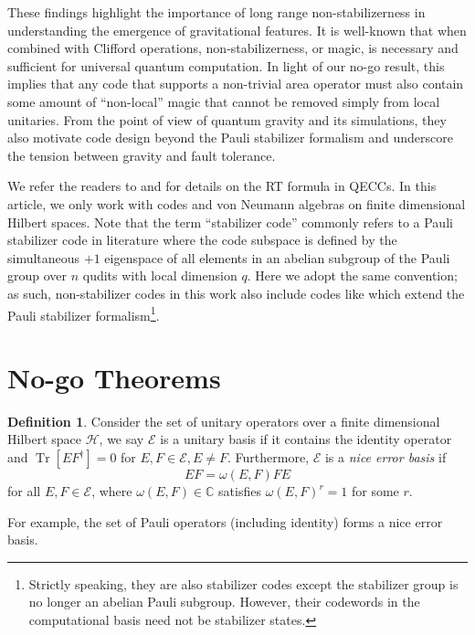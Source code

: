 \documentclass[a4paper,11pt]{article}
\theoremstyle{definition}
\newtheorem{definition}{Definition}[section]
\numberwithin{equation}{section}
\DeclareMathOperator{\Tr}{Tr}
\begin{document}
These findings highlight the importance of long range non-stabilizerness\cite{NLmagic,White:2020zoz,Bao:2022mkc,Liu:2020yso} in understanding the emergence of gravitational features. It is well-known that when combined with Clifford operations, non-stabilizerness, or magic, is necessary and sufficient for universal quantum computation. In light of our no-go result,  this implies that any code that supports a non-trivial area operator must also contain some amount of ``non-local'' magic that cannot be removed simply from local unitaries. 
From the point of view of quantum gravity and its simulations, they also motivate code design beyond the Pauli stabilizer formalism and underscore the tension between gravity and fault tolerance.

We refer the readers to \cite{Harlow:2016vwg} and \cite{Pollack:2021yij} for details on the RT formula in QECCs. In this article, we only work with codes and von Neumann algebras on finite dimensional Hilbert spaces.  Note that the term ``stabilizer code'' commonly refers to a Pauli stabilizer code in literature where the code subspace is defined by the simultaneous $+1$ eigenspace of all elements in an abelian subgroup of the Pauli group over $n$ qudits with local dimension $q$. Here we adopt the same convention; as such, non-stabilizer codes in this work also include codes like \cite{XS,XP} which extend the Pauli stabilizer formalism\footnote{Strictly speaking, they are also stabilizer codes except the stabilizer group is no longer an abelian Pauli subgroup. However, their codewords in the computational basis need not be stabilizer states.}.





\section{No-go Theorems}
\begin{definition}\label{def:nicebasis}
    Consider the set of unitary operators over a finite dimensional Hilbert space $\mathcal{H}$, we say $\mathcal{E}$ is a unitary basis if it contains the identity operator and $\Tr[EF^{\dagger}]=0$ for $E,F\in \mathcal{E}, E\ne F$. Furthermore, $\mathcal{E}$ is a \emph{nice error basis} \cite{nice_err_basis1,nice_err_basis2} if
    $$EF=\omega(E,F)FE$$
    for all $E,F\in \mathcal{E}$, where $\omega(E,F)\in \mathbb{C}$ satisfies $\omega(E,F)^r=1$ for some $r$.
\end{definition}
For example, the set of Pauli operators (including identity) forms a nice error basis.
\end{document}

